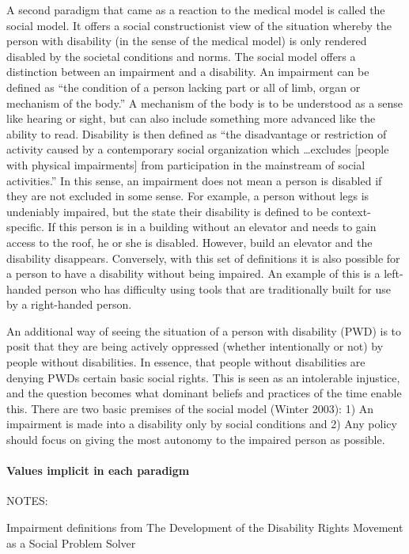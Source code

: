 \documentclass{lps}
\begin{document}
A second paradigm that came as a reaction to the medical model is called the
social model. It offers a social constructionist view of the situation whereby
the person with disability (in the sense of the medical model) is only
rendered  disabled by the societal conditions and norms. The social model
offers a distinction between an impairment and a disability. An impairment can
be defined as ``the condition of a person lacking part or all of limb, organ
or mechanism of the body.'' A mechanism of the body is to be understood as a
sense like hearing or sight, but can also include something more advanced like
the ability to read. Disability is then defined as ``the disadvantage or
restriction of activity caused by a contemporary social organization which
\ldots excludes [people with physical impairments] from participation in the
mainstream of social activities.'' In this sense, an impairment does not mean a
person is disabled if they are not excluded in some sense. For example, a
person without legs is undeniably impaired, but the state their disability is
defined to be context-specific. If this person is in a building without an
elevator and needs to gain access to the roof, he or she is disabled. However,
build an elevator and the disability disappears. Conversely, with this set of
definitions it is also possible for a person to have a disability without
being impaired. An example of this is a left-handed person who has difficulty
using tools that are traditionally built for use by a right-handed person.

An additional way of seeing the situation of a person with disability (PWD) is
to posit that they are being actively oppressed (whether intentionally or not)
by people without disabilities. In essence, that people without disabilities
are denying PWDs certain basic social rights. This is seen as an intolerable
injustice, and the question becomes what dominant beliefs and practices of the
time enable this. There are two basic premises of the social model (Winter
2003): 1) An impairment is made into a disability only by social conditions
and 2) Any policy should focus on giving the most autonomy to the impaired
person as possible.  

\paragraph{Values implicit in each paradigm}


NOTES:

Impairment definitions from The Development of the Disability Rights Movement
as a Social Problem Solver 
\end{document}
